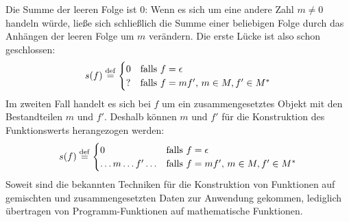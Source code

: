 Die Summe der leeren Folge ist $0$:  Wenn es sich um eine andere
Zahl $m \neq 0$ handeln würde, ließe sich schließlich die Summe einer
beliebigen Folge durch das Anhängen der leeren Folge um $m$ verändern.
Die erste Lücke ist also schon geschlossen:
%
\begin{displaymath}
  s(f) \stackrel{\rm def}{=}
  \begin{cases}
    0 & \textrm{falls $f = \epsilon$}\\
    ? & \textrm{falls $f = mf'$, $m\in M, f'\in M^\ast$}
  \end{cases}
\end{displaymath}
%
Im zweiten Fall handelt es sich bei $f$ um ein
zusammengesetztes Objekt mit den Bestandteilen $m$ und $f'$.
Deshalb können $m$ und $f'$ für die Konstruktion des Funktionswerts
herangezogen werden:
%
\begin{displaymath}
  s(f) \stackrel{\rm def}{=}
  \begin{cases}
    0 & \textrm{falls $f = \epsilon$}\\
    \ldots m \ldots f' \ldots & \textrm{falls $f = mf'$, $m\in M, f'\in M^\ast$}
  \end{cases}
\end{displaymath}
%
Soweit sind die bekannten Techniken für die Konstruktion von
Funktionen auf gemischten und zusammengesetzten Daten zur Anwendung
gekommen, lediglich übertragen von Programm-Funktionen auf
mathematische Funktionen.

